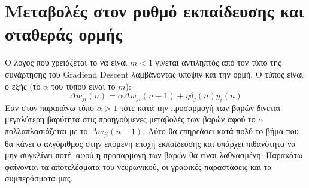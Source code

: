 \documentclass[12pt,a4paper]{article}
\newcommand{\tl}{\textlatin}
\begin{document}
    \section{Μεταβολές στον ρυθμό εκπαίδευσης και σταθεράς ορμής}
         Ο λόγος που χρειάζεται το να είναι $m<1$ γίνεται αντιληπτός από τον τύπο της συνάρτησης του \tl{Gradiend Descent} λαμβάνοντας υπόψιν και την ορμή. Ο τύπος είναι ο εξής (το $\alpha$ του τύπου είναι το $m$):
        $$ \Delta w_{ji}(n) = \alpha\Delta w_{ji}(n-1) + \eta\delta_j(n)y_i(n) $$
        Εάν στον παραπάνω τύπο $\alpha>1$ τότε κατά την προσαρμογή των βαρών δίνεται μεγαλύτερη βαρύτητα στις προηγούμενες μεταβολές των βαρών αφού το $\alpha$ πολλαπλασιάζεται με το $\Delta w_{ji}(n-1)$. Αύτο θα επηρεάσει κατά πολύ το βήμα που θα κάνει ο αλγόριθμος στην επόμενη εποχή εκπαίδευσης και υπάρχει πιθανότητα να μην συγκλίνει ποτέ, αφού η προσαρμογή των βαρών θα είναι λαθνασμένη. \newpage
        Παρακάτω φαίνονται τα αποτελέσματα του νευρωνικού, οι γραφικές παραστάσεις και τα συμπεράσματα μας.
\end{document}
